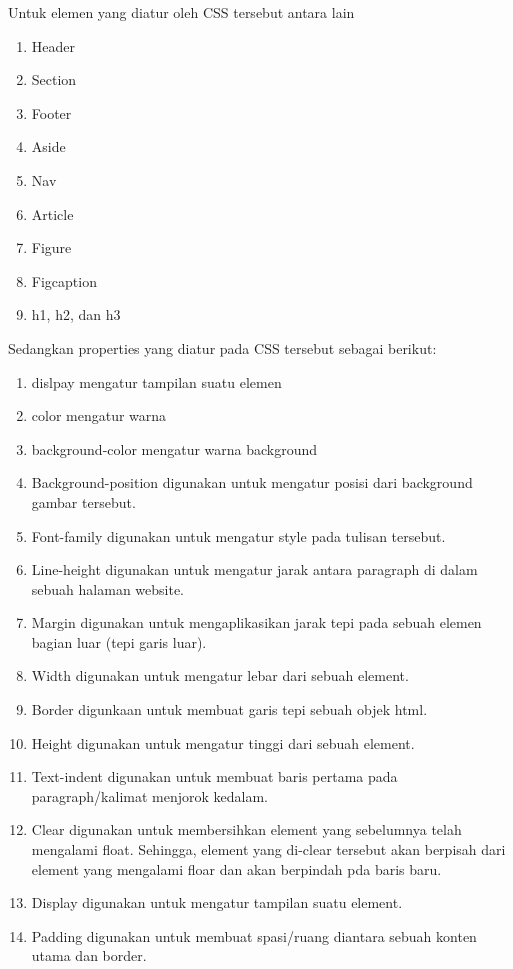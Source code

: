 \documentclass[a4paper,12pt]{article}
\begin{document}
Untuk elemen yang diatur oleh CSS tersebut antara lain
\begin{enumerate}
   \item Header
   \item Section
   \item Footer
   \item Aside
   \item Nav
   \item Article
   \item Figure
   \item Figcaption
   \item h1, h2, dan h3
\end{enumerate}

Sedangkan properties yang diatur pada CSS tersebut sebagai berikut:
\begin{enumerate}
    \item dislpay mengatur tampilan suatu elemen
    \item color mengatur warna
    \item background-color mengatur warna background
    \item Background-position digunakan untuk mengatur posisi dari background gambar tersebut.
    \item Font-family digunakan untuk mengatur style pada tulisan tersebut.
    \item Line-height digunakan untuk mengatur jarak antara paragraph di dalam sebuah halaman website.
    \item Margin digunakan untuk mengaplikasikan jarak tepi pada sebuah elemen bagian luar (tepi garis luar).
    \item Width digunakan untuk mengatur lebar dari sebuah element.
    \item Border digunkaan untuk membuat garis tepi sebuah objek html.
    \item Height digunakan untuk mengatur tinggi dari sebuah element.
    \item Text-indent digunakan untuk membuat baris pertama pada paragraph/kalimat menjorok kedalam.
    \item Clear digunakan untuk membersihkan element yang sebelumnya telah mengalami float. Sehingga, element yang di-clear tersebut akan berpisah dari element yang mengalami floar dan akan berpindah pda baris baru.
    \item Display digunakan untuk mengatur tampilan suatu element.
    \item Padding digunakan untuk membuat spasi/ruang diantara sebuah konten utama dan border.

\end{enumerate}
\end{document}
